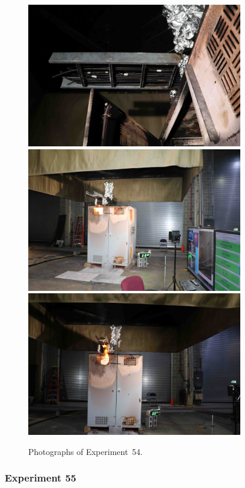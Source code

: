 \begin{figure}[p]
\centering
\includegraphics[height=2.50in]{../FIGURES/Test_54_cables} \\
\includegraphics[height=2.50in]{../FIGURES/Test_54_15_min_20_s} \\
\includegraphics[height=2.50in]{../FIGURES/Test_54_22_min_31_s}
\caption[Photographs of Experiment~54]{Photographs of Experiment~54.}
\label{fig:Test_54_photos}
\end{figure}


\clearpage

\subsubsection{Experiment 55}

